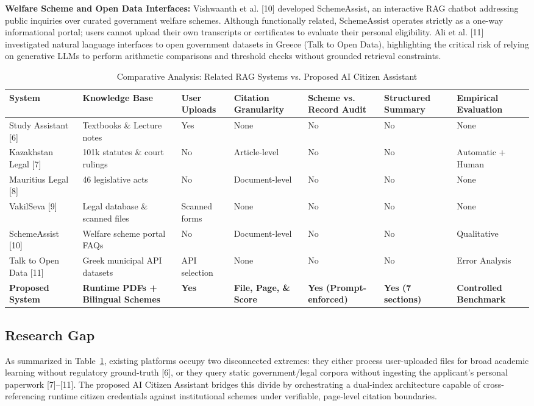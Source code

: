 \documentclass[conference]{IEEEtran}
\begin{document}
\textbf{Welfare Scheme and Open Data Interfaces:} Vishwaanth et al. [10] developed SchemeAssist, an interactive RAG chatbot addressing public inquiries over curated government welfare schemes. Although functionally related, SchemeAssist operates strictly as a one-way informational portal; users cannot upload their own transcripts or certificates to evaluate their personal eligibility. Ali et al. [11] investigated natural language interfaces to open government datasets in Greece (Talk to Open Data), highlighting the critical risk of relying on generative LLMs to perform arithmetic comparisons and threshold checks without grounded retrieval constraints.

\begin{table}[t]
\caption{Comparative Analysis: Related RAG Systems vs. Proposed AI Citizen Assistant}
\label{tab:comparison}
\centering
\small
\begin{tabular}{p{3.2cm}p{3.0cm}p{1.6cm}p{2.2cm}p{2.2cm}p{2.0cm}p{1.8cm}}
\hline
\textbf{System} & \textbf{Knowledge Base} & \textbf{User Uploads} & \textbf{Citation Granularity} & \textbf{Scheme vs. Record Audit} & \textbf{Structured Summary} & \textbf{Empirical Evaluation} \\
\hline
Study Assistant [6] & Textbooks \& Lecture notes & Yes & None & No & No & None \\
Kazakhstan Legal [7] & 101k statutes \& court rulings & No & Article-level & No & No & Automatic + Human \\
Mauritius Legal [8] & 46 legislative acts & No & Document-level & No & No & None \\
VakilSeva [9] & Legal database \& scanned files & Scanned forms & None & No & No & None \\
SchemeAssist [10] & Welfare scheme portal FAQs & No & Document-level & No & No & Qualitative \\
Talk to Open Data [11] & Greek municipal API datasets & API selection & None & No & No & Error Analysis \\
\textbf{Proposed System} & \textbf{Runtime PDFs + Bilingual Schemes} & \textbf{Yes} & \textbf{File, Page, \& Score} & \textbf{Yes (Prompt-enforced)} & \textbf{Yes (7 sections)} & \textbf{Controlled Benchmark} \\
\hline
\end{tabular}
\end{table}

\subsection{Research Gap}
As summarized in Table~\ref{tab:comparison}, existing platforms occupy two disconnected extremes: they either process user-uploaded files for broad academic learning without regulatory ground-truth [6], or they query static government/legal corpora without ingesting the applicant's personal paperwork [7]--[11]. The proposed AI Citizen Assistant bridges this divide by orchestrating a dual-index architecture capable of cross-referencing runtime citizen credentials against institutional schemes under verifiable, page-level citation boundaries.
\end{document}
